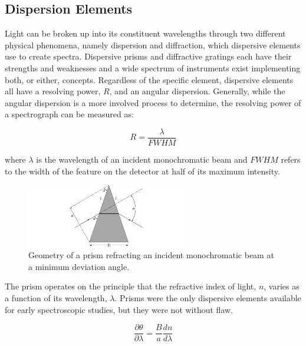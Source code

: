 \subsection{Dispersion Elements} \label{subsec:dispersion}

Light can be broken up into its constituent wavelengths through two different physical phenomena, namely dispersion and diffraction, which dispersive elements use to create spectra. Dispersive prisms and diffractive gratings each have their strengths and weaknesses and a wide spectrum of instruments exist implementing both, or either, concepts. Regardless of the specific element, dispersive elements all have a resolving power, $R$, and an angular dispersion. Generally, while the angular dispersion is a more involved process to determine, the resolving power of a spectrograph can be measured as:

\begin{equation}
	R = \frac{\lambda}{FWHM}
    \label{eq:resolving_power}
\end{equation}

\noindent where $\lambda$ is the wavelength of an incident monochromatic beam and $FWHM$ refers to the width of the feature on the detector at half of its maximum intensity.
\prgph

\begin{figure}[t]
    \centering
    \includegraphics[width = 7cm]{figures/2_prism_diagram.pdf}
    \caption{Geometry of a prism refracting an incident monochromatic beam at a minimum deviation angle.}
    \label{fig:prism_diagram}
\end{figure}

The prism operates on the principle that the refractive index of light, $n$, varies as a function of its wavelength, $\lambda$. Prisms were the only dispersive elements available for early spectroscopic studies, but they were not without flaw.

\begin{equation}
	\frac{\partial \theta}{\partial \lambda} = \frac{B}{a}\frac{dn}{d\lambda}%
    \label{eq:prism_angular_dispersion}
\end{equation}

